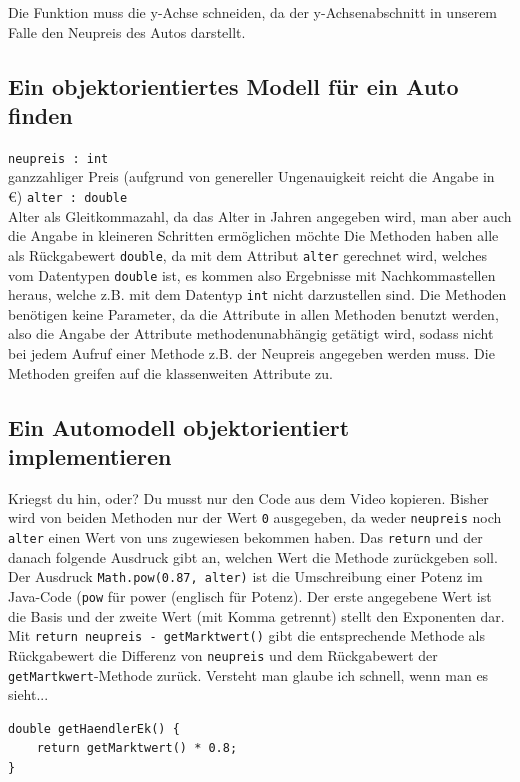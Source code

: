 \documentclass{scrartcl}   %
\begin{document}
Die Funktion muss die y-Achse schneiden, da der y-Achsenabschnitt in unserem Falle den Neupreis des Autos darstellt.

\subsection{Ein objektorientiertes Modell für ein Auto finden}

\begin{itemize}
    \barrow \texttt{neupreis : int}\\
    ganzzahliger Preis (aufgrund von genereller Ungenauigkeit reicht die Angabe in \euro)
    \barrow \texttt{alter : double}\\
    Alter als Gleitkommazahl, da das Alter in Jahren angegeben wird, man aber auch die Angabe in kleineren Schritten ermöglichen möchte
    \barrow Die Methoden haben alle als Rückgabewert \texttt{double}, da mit dem Attribut \texttt{alter} gerechnet wird, welches vom Datentypen \texttt{double} ist, es kommen also Ergebnisse mit Nachkommastellen heraus, welche z.B. mit dem Datentyp \texttt{int} nicht darzustellen sind.
    \barrow Die Methoden benötigen keine Parameter, da die Attribute in allen Methoden benutzt werden, also die Angabe der Attribute methodenunabhängig getätigt wird, sodass nicht bei jedem Aufruf einer Methode z.B. der Neupreis angegeben werden muss. Die Methoden greifen auf die klassenweiten Attribute zu.
\end{itemize}

\newpage

\subsection{Ein Automodell objektorientiert implementieren}

\begin{itemize}
    \barrow Kriegst du hin, oder? Du musst nur den Code aus dem Video kopieren.
    \barrow Bisher wird von beiden Methoden nur der Wert \texttt{0} ausgegeben, da weder \texttt{neupreis} noch \texttt{alter} einen Wert von uns zugewiesen bekommen haben.
    \barrow Das \texttt{return} und der danach folgende Ausdruck gibt an, welchen Wert die Methode zurückgeben soll.
    \barrow Der Ausdruck \texttt{Math.pow(0.87, alter)} ist die Umschreibung einer Potenz im Java-Code (\texttt{pow} für \glqq power\grqq{} (englisch für Potenz). Der erste angegebene Wert ist die Basis und der zweite Wert (mit Komma getrennt) stellt den Exponenten dar.
    \barrow Mit \texttt{return neupreis - getMarktwert()} gibt die entsprechende Methode als Rückgabewert die Differenz von \texttt{neupreis} und dem Rückgabewert der \texttt{getMartkwert}-Methode zurück.
    \barrow Versteht man glaube ich schnell, wenn man es sieht...\\
    \begin{lstlisting}
double getHaendlerEk() {
    return getMarktwert() * 0.8;
}
\end{lstlisting}
\end{itemize}
    
\end{document}
